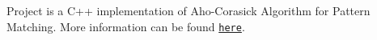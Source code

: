 Project is a C++ implementation of Aho-\/\+Corasick Algorithm for Pattern Matching. More information can be found \href{https://www.researchgate.net/publication/220423622_Efficient_string_matching_An_aid_to_bibliographic_search}{\tt here}. 
